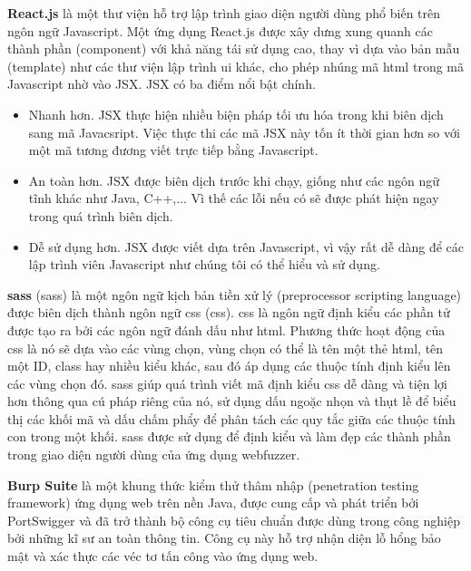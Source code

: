 \textbf{React.js} là một thư viện hỗ trợ lập trình giao diện người dùng phổ biến trên ngôn ngữ Javascript. Một ứng dụng React.js được xây dưng xung quanh các thành phần (component) với khả năng tái sử dụng cao, thay vì dựa vào bản mẫu (template) như các thư viện lập trình \acrshort{ui} khác, cho phép nhúng mã \acrshort{html} trong mã Javascript nhờ vào JSX. JSX có ba điểm nổi bật chính.
\begin{itemize}
    \item Nhanh hơn. JSX thực hiện nhiều biện pháp tối ưu hóa trong khi biên dịch sang mã Javacsript. Việc thực thi các mã JSX này tốn ít thời gian hơn so với một mã tương đương viết trực tiếp bằng Javascript.
    \item An toàn hơn. JSX được biên dịch trước khi chạy, giống như các ngôn ngữ tĩnh khác như Java, C++,... Vì thế các lỗi nếu có sẽ được phát hiện ngay trong quá trình biên dịch.
    \item Dễ sử dụng hơn. JSX được viết dựa trên Javascript, vì vậy rất dễ dàng để các lập trình viên Javascript như chúng tôi có thể hiểu và sử dụng.
\end{itemize}
\textbf{\acrshort{sass}} (\acrlong{sass}) là một ngôn ngữ kịch bản tiền xử lý (preprocessor scripting language) được biên dịch thành ngôn ngữ \acrshort{css} (\acrlong{css}). \acrshort{css} là ngôn ngữ định kiểu các phần tử được tạo ra bởi các ngôn ngữ đánh dấu như \acrshort{html}. Phương thức hoạt động của \acrshort{css} là nó sẽ dựa vào các vùng chọn, vùng chọn có thể là tên một thẻ \acrshort{html}, tên một ID, class hay nhiều kiểu khác, sau đó áp dụng các thuộc tính định kiểu lên các vùng chọn đó. \acrshort{sass} giúp quá trình viết mã định kiểu \acrshort{css} dễ dàng và tiện lợi hơn thông qua cú pháp riêng của nó, sử dụng dấu ngoặc nhọn và thụt lề để biểu thị các khối mã và dấu chấm phẩy để phân tách các quy tắc giữa các thuộc tính con trong một khối. \acrshort{sass} được sử dụng để định kiểu và làm đẹp các thành phần trong giao diện người dùng của ứng dụng webfuzzer.\par
\textbf{Burp Suite} \parencite{burpsuite} là một khung thức kiểm thử thâm nhập (penetration testing framework) ứng dụng web trên nền Java, được cung cấp và phát triển bởi PortSwigger và đã trở thành bộ công cụ tiêu chuẩn được dùng trong công nghiệp bởi những kĩ sư an toàn thông tin. Công cụ này hỗ trợ nhận diện lỗ hổng bảo mật và xác thực các véc tơ tấn công vào ứng dụng web.
